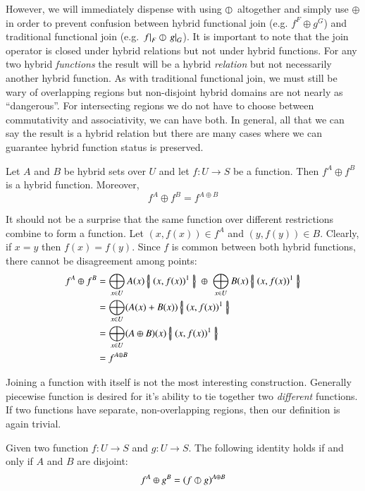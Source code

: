 However, we will immediately dispense with using $\varobar^{}$ altogether and simply use $\oplus$ 
in order to prevent confusion between hybrid functional join (e.g. $f^F \oplus g^G$) and 
traditional functional join (e.g. $\left.f\right|_{F} \varobar \left.g\right|_{G}$).
It is important to note that the join operator is closed under hybrid relations but not under hybrid functions.
For any two hybrid \emph{functions} the result will be a hybrid \emph{relation} 
but not necessarily another hybrid function.
As with traditional functional join, we must still be wary of overlapping regions
 but non-disjoint hybrid domains are not nearly as ``dangerous''.
For intersecting regions we do not have to choose between commutativity and associativity, we can have both.
In general, all that we can say the result is a hybrid relation but there are many cases where we can guarantee hybrid function status is preserved.


\begin{lemma}
	\label{thm:compatible1}
	Let $A$ and $B$ be hybrid sets over $U$ and let $f: U \to S$ be a function.
	Then $f^A \oplus f^B$ is a hybrid function.
	Moreover,
	\begin{equation}
		f^A \oplus f^B = f^{A \oplus B}
	\end{equation}
\end{lemma}


It should not be a surprise that the same function over different restrictions combine to form a function.
Let $(x,f(x)) \in f^A$ and $(y,f(y)) \in B$. Clearly, if $x=y$ then $f(x)=f(y)$. 
Since $f$ is common between both hybrid functions, there cannot be disagreement among points:
\begin{align*}
	f^A \oplus f^B 
		&= \bigoplus_{x \in U} A(x) \hset{ (x, f(x) )^1 } 
			\; \oplus \; \bigoplus_{x \in U} B(x) \hset{ (x, f(x) )^1 } \\
		&= \bigoplus_{x \in U} (A(x) + B(x)) \hset{ (x, f(x) )^1 } \\
		&= \bigoplus_{x \in U} (A \oplus B)(x) \hset{ (x, f(x) )^1 } \\ 
		&= f^{A \oplus B}
\end{align*}



Joining a function with itself is not the most interesting construction.
Generally piecewise function is desired for it's ability to tie together two \emph{different} functions.
If two functions have separate, non-overlapping regions, then our definition is again trivial.


\begin{lemma}
	\label{thm:compatible2}
	Given two function $f : U \to S$ and $g : U \to S$. The following identity holds if and only if $A$ and $B$ are disjoint:
	\begin{equation}
		f^A \oplus g^B = (f \varobar g)^{A \oplus B}
	\end{equation}
\end{lemma}


